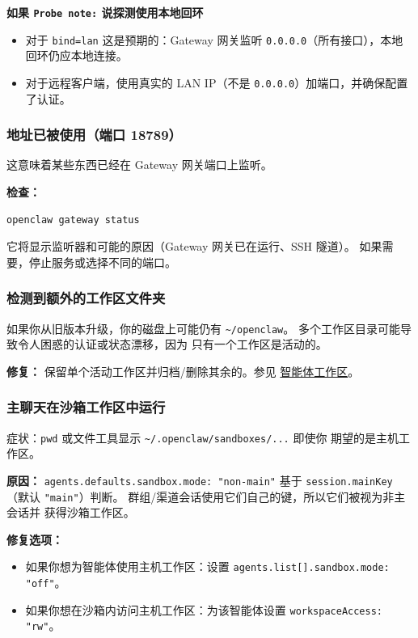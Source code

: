 \textbf{如果 \texttt{Probe note:} 说探测使用本地回环}

\begin{itemize}
  \item 对于 \texttt{bind=lan} 这是预期的：Gateway 网关监听 \texttt{0.0.0.0}（所有接口），本地回环仍应本地连接。
  \item 对于远程客户端，使用真实的 LAN IP（不是 \texttt{0.0.0.0}）加端口，并确保配置了认证。
\end{itemize}


\subsubsection{地址已被使用（端口 18789）}


这意味着某些东西已经在 Gateway 网关端口上监听。

\textbf{检查：}

\begin{lstlisting}[language=bash]
openclaw gateway status
\end{lstlisting}


它将显示监听器和可能的原因（Gateway 网关已在运行、SSH 隧道）。
如果需要，停止服务或选择不同的端口。

\subsubsection{检测到额外的工作区文件夹}


如果你从旧版本升级，你的磁盘上可能仍有 \texttt{\textasciitilde{}/openclaw}。
多个工作区目录可能导致令人困惑的认证或状态漂移，因为
只有一个工作区是活动的。

\textbf{修复：} 保留单个活动工作区并归档/删除其余的。参见
\href{/concepts/agent-workspace\#extra-workspace-folders}{智能体工作区}。

\subsubsection{主聊天在沙箱工作区中运行}


症状：\texttt{pwd} 或文件工具显示 \texttt{\textasciitilde{}/.openclaw/sandboxes/...} 即使你
期望的是主机工作区。

\textbf{原因：} \texttt{agents.defaults.sandbox.mode: "non-main"} 基于 \texttt{session.mainKey}（默认 \texttt{"main"}）判断。
群组/渠道会话使用它们自己的键，所以它们被视为非主会话并
获得沙箱工作区。

\textbf{修复选项：}

\begin{itemize}
  \item 如果你想为智能体使用主机工作区：设置 \texttt{agents.list[].sandbox.mode: "off"}。
  \item 如果你想在沙箱内访问主机工作区：为该智能体设置 \texttt{workspaceAccess: "rw"}。
\end{itemize}



